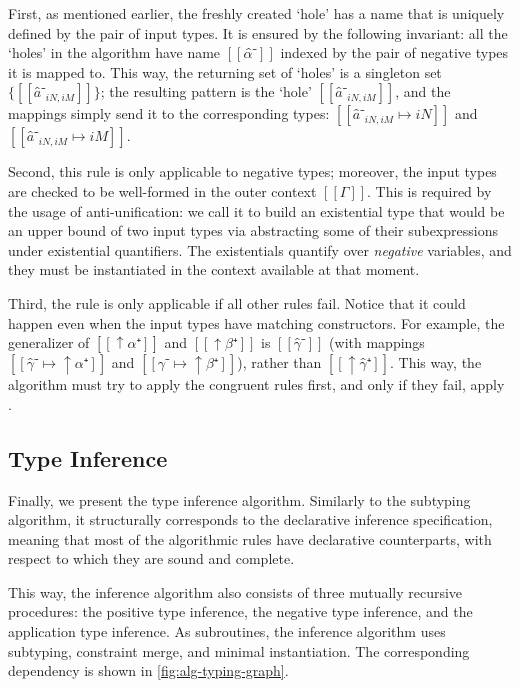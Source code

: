   First, as mentioned earlier, the freshly created `hole' has a name that is
  uniquely defined by the pair of input types. It is ensured by the following
  invariant: all the `holes' in the algorithm have name $[[α̂⁻]]$ indexed by the
  pair of negative types it is mapped to. This way, the returning set of `holes'
  is a singleton set $\{ [[ â⁻_{iN, iM} ]]\}$; the resulting pattern is the
  `hole' $[[â⁻_{iN, iM}]]$, and the mappings simply send it to the
  corresponding types: $[[â⁻_{iN, iM} ↦ iN]]$ and $[[â⁻_{iN, iM} ↦ iM]]$.

  Second, this rule is only applicable to negative types; moreover, the input
  types are checked to be well-formed in the outer context $[[Γ]]$. This is
  required by the usage of anti-unification: we call it to build an existential
  type that would be an upper bound of two input types via abstracting some of
  their subexpressions under existential quantifiers. The existentials quantify
  over \emph{negative} variables, and they must be instantiated in the context
  available at that moment.

  Third, the rule is only applicable if all other rules fail. Notice that it
  could happen even when the input types have matching constructors. For
  example, the generalizer of $[[↑α⁺]]$ and $[[↑β⁺]]$ is $[[γ̂⁻]]$ (with
  mappings $[[γ̂⁻ ↦ ↑α⁺]]$ and $[[γ̂⁻ ↦ ↑β⁺]]$), rather than $[[↑γ̂⁺]]$. This
  way, the algorithm must try to apply the congruent rules first, and only if
  they fail, apply .
  
\subsection{Type Inference}
\label{sec:typing}

Finally, we present the type inference algorithm. Similarly to the subtyping
algorithm, it structurally corresponds to the declarative inference
specification, meaning that most of the algorithmic rules have declarative
counterparts, with respect to which they are sound and complete.

This way, the inference algorithm also consists of three mutually recursive
procedures: the positive type inference, the negative type inference, and the
application type inference. As subroutines, the inference algorithm uses
subtyping, constraint merge, and minimal instantiation. The corresponding
dependency is shown in \cref{fig:alg-typing-graph}.


